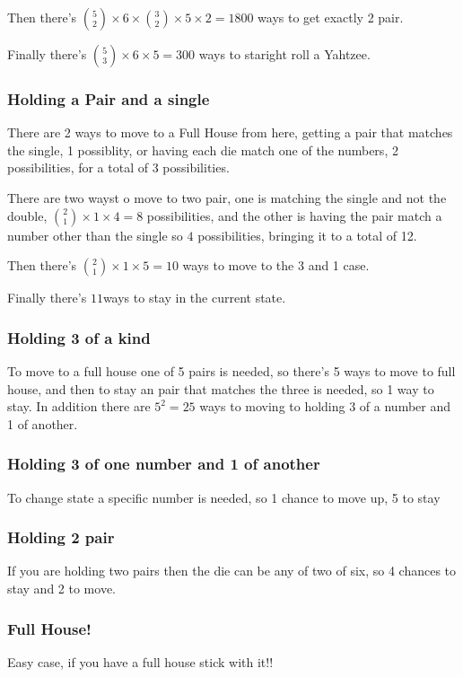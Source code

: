 Then there's ${5 \choose 2}\times6\times{3 \choose 2}\times5\times2 = 1800$ ways to get exactly 2 pair.

Finally there's ${5 \choose 3}\times6\times5 =300$ ways to staright roll a Yahtzee.

\subsubsection{Holding a Pair and a single}
There are 2 ways to move to a Full House from here, getting a pair that matches the single, 1 possiblity, or having each die match one of the numbers, 2 possibilities, for a total of 3 possibilities.

There are two wayst o move to two pair, one is matching the single and not the double, ${2 \choose 1} \times 1 \times 4 = 8$ possibilities, and the other is having the pair match a number other than the single so $ 4 $ possibilities, bringing it to a total of 12.

Then there's ${2 \choose 1} \times1 \times 5= 10$ ways to move to the 3 and 1 case.

Finally there's $ 11$ways to stay  in the current state.
\subsubsection{Holding 3 of a kind}
To move to a full house one of 5 pairs is needed, so there's 5 ways to move to full house, and then to stay an pair that matches the three is needed, so 1 way to stay. In addition there are $5^2=25$ ways to moving to holding 3 of a number and 1 of another.
\subsubsection{Holding 3 of one number and 1 of another}
To change state a specific number is needed, so 1 chance to move up, 5  to stay
\subsubsection{Holding 2 pair}
If you are holding two pairs then the die can be any of two of six, so 4 chances to stay and 2 to move.
\subsubsection{Full House!}
Easy case, if you have a full house stick with it!!

